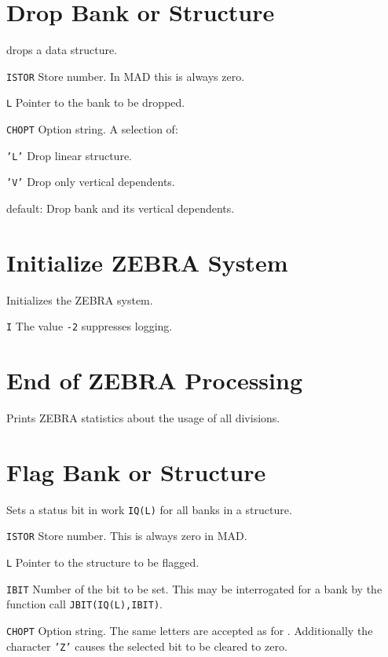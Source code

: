\section{Drop Bank or Structure}
\label{MZDROP}
    drops a data structure.
\begin{mylist}
\item[\tt ISTOR]
    Store number. In MAD this is always zero.
\item[\tt L]
    Pointer to the bank to be dropped.
\item[\tt CHOPT]
    Option string. A selection of:
    \begin{mylist}
    \item[\tt 'L']
        Drop linear structure.
    \item[\tt 'V']
        Drop only vertical dependents.
    \item[default:]
        Drop bank and its vertical dependents.
    \end{mylist}
\end{mylist}

\section{Initialize ZEBRA System}
\label{MZEBRA}
Initializes the ZEBRA system.
\begin{mylist}
\item[\tt I]
    The value {\tt -2} suppresses logging.
\end{mylist}

\section{End of ZEBRA Processing}
\label{MZEND}
Prints ZEBRA statistics about the usage of all divisions.

\section{Flag Bank or Structure}
\label{MZFLAG}
Sets a status bit in work {\tt IQ(L)} for all banks in a structure.
\begin{mylist}
\item[\tt ISTOR]
    Store number. This is always zero in MAD.
\item[\tt L]
    Pointer to the structure to be flagged.
\item[\tt IBIT]
    Number of the bit to be set.
    This may be interrogated for a bank by the function call
    {\tt JBIT(IQ(L),IBIT)}.
\item[\tt CHOPT]
    Option string.
    The same letters are accepted as for .
    Additionally the character {\tt 'Z'} causes the selected bit to be
    cleared to zero.
\end{mylist}

